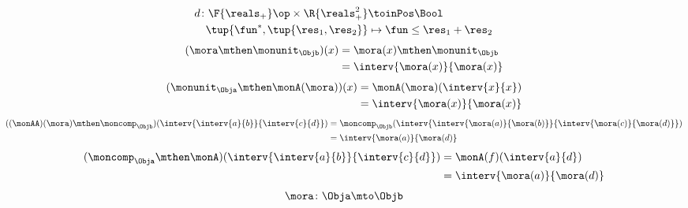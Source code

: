 {\begin{forslides}
\begin{equation*}
\begin{aligned}
                d\colon \F{\reals_+}\op \times \R{\reals_+^2}&\toinPos \Bool\\
                \tup{\fun^*,\tup{\res_1,\res_2}}&\mapsto \fun \leq \res_1+\res_2
            \end{aligned}
        \end{equation*}
        \begin{equation*}
            \label{eq:arrow_1}
            \begin{aligned}
            (\mora \mthen \monunit_\Objb)(x)
                &=\mora(x)\mthen \monunit_\Objb\\
                &=\interv{\mora(x)}{\mora(x)}
            \end{aligned}
        \end{equation*}
        \begin{equation*}
            \label{eq:arrow_2}
            \begin{aligned}
            (\monunit_\Obja \mthen \monA(\mora))(x)
                &=\monA(\mora)(\interv{x}{x})\\
                &=\interv{\mora(x)}{\mora(x)}
            \end{aligned}
        \end{equation*}
        \begin{equation*}
            \label{eq:arrow_3}
            \begin{aligned}
                ((\monAA)(\mora)\mthen \moncomp_\Objb)(\interv{\interv{a}{b}}{\interv{c}{d}})&=\moncomp_\Objb(\interv{\interv{\mora(a)}{\mora(b)}}{\interv{\mora(c)}{\mora(d)}})\\
                &=\interv{\mora(a)}{\mora(d)}
            \end{aligned}
        \end{equation*}
        \begin{equation*}
            \label{eq:arrow_4}
            \begin{aligned}
            (\moncomp_\Obja\mthen \monA)(\interv{\interv{a}{b}}{\interv{c}{d}})
                &=\monA(f)(\interv{a}{d})\\
                &=\interv{\mora(a)}{\mora(d)}
            \end{aligned}
        \end{equation*}
        \begin{equation*}
            \label{eq:arrow_5}
            \mora\colon \Obja \mto \Objb
        \end{equation*}
    \end{forslides}
}
